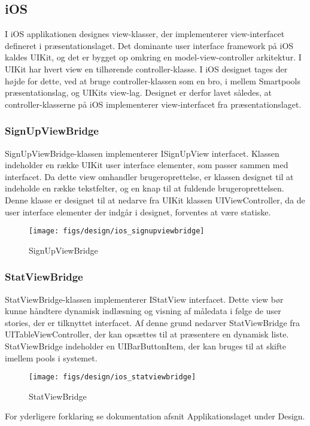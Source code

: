 \subsection{iOS}
I iOS applikationen designes view-klasser, der implementerer view-interfacet defineret i præsentationslaget. Det dominante user interface framework på iOS kaldes UIKit, og det er bygget op omkring en model-view-controller arkitektur. I UIKit har hvert view en tilhørende controller-klasse. I iOS designet tages der højde for dette, ved at bruge controller-klassen som en bro, i mellem Smartpools præsentationslag, og UIKits view-lag. Designet er derfor lavet således, at controller-klasserne på iOS implementerer view-interfacet fra præsentationslaget.

\subsubsection{SignUpViewBridge}
SignUpViewBridge-klassen implementerer ISignUpView interfacet. Klassen indeholder en række UIKit user interface elementer, som passer sammen med interfacet. Da dette view omhandler brugeroprettelse, er klassen designet til at indeholde en række tekstfelter, og en knap til at fuldende brugeroprettelsen. Denne klasse er designet til at nedarve fra UIKit klassen UIViewController, da de user interface elementer der indgår i designet, forventes at være statiske.

\begin{figure}
	\centering
	\texttt{[image: figs/design/ios\_signupviewbridge]}
	\caption{SignUpViewBridge}
	\label{fig:ios_signupviewbridge}
\end{figure}

\subsubsection{StatViewBridge}
StatViewBridge-klassen implementerer IStatView interfacet. Dette view bør kunne håndtere dynamisk indlæsning og visning af måledata i følge de user stories, der er tilknyttet interfacet. Af denne grund nedarver StatViewBridge fra UITableViewController, der kan opsættes til at præsentere en dynamisk liste. StatViewBridge indeholder en UIBarButtonItem, der kan bruges til at skifte imellem pools i systemet.

\begin{figure}
	\centering
	\texttt{[image: figs/design/ios\_statviewbridge]}
	\caption{StatViewBridge}
	\label{fig:ios_statviewbridge}
\end{figure}
For yderligere forklaring se dokumentation afsnit Applikationslaget under Design.